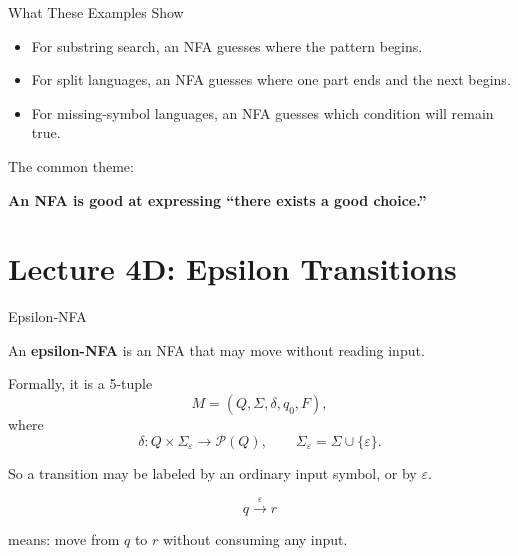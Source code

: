 \documentclass[10pt,aspectratio=169]{beamer}
\newcommand{\eps}{\varepsilon}
\begin{document}
\begin{frame}{What These Examples Show}

\begin{itemize}
\item For substring search, an NFA guesses where the pattern begins.
\item For split languages, an NFA guesses where one part ends and the next begins.
\item For missing-symbol languages, an NFA guesses which condition will remain true.
\end{itemize}

\vspace{0.8em}

\pause

The common theme:

\begin{center}
\textbf{An NFA is good at expressing ``there exists a good choice.''}
\end{center}

\end{frame}
\section{Lecture 4D: Epsilon Transitions}

\begin{frame}{Epsilon-NFA}

An \textbf{epsilon-NFA} is an NFA that may move without reading input.

\vspace{0.7em}

Formally, it is a 5-tuple
\[
M=(Q,\Sigma,\delta,q_0,F),
\]
where
\[
\delta:Q\times\Sigma_{\eps}\rightarrow \mathcal P(Q),
\qquad
\Sigma_{\eps}=\Sigma\cup\{\eps\}.
\]

\vspace{0.7em}

So a transition may be labeled by an ordinary input symbol, or by \(\eps\).

\[
q \xrightarrow{\eps} r
\]

means: move from \(q\) to \(r\) without consuming any input.

\end{frame}
\end{document}
